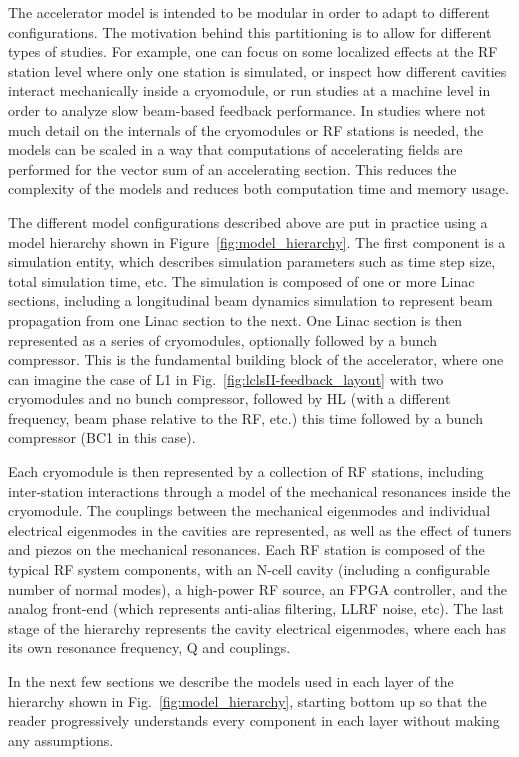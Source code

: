 \documentclass[a4paper,12pt]{article}
\begin{document}
The accelerator model is intended to be modular in order to adapt to different configurations. The motivation behind this partitioning is to allow for different types of studies. For example, one can focus on some localized effects at the RF station level where only one station is simulated, or inspect how different cavities interact mechanically inside a cryomodule, or run studies at a machine level in order to analyze slow beam-based feedback performance. In studies where not much detail on the internals of the cryomodules or RF stations is needed, the models can be scaled in a way that computations of accelerating fields are performed for the vector sum of an accelerating section. This reduces the complexity of the models and reduces both computation time and memory usage.

The different model configurations described above are put in practice using a model hierarchy shown in Figure~\ref{fig:model_hierarchy}. The first component is a simulation entity, which describes simulation parameters such as time step size, total simulation time, etc. The simulation is composed of one or more Linac sections, including a longitudinal beam dynamics simulation to represent beam propagation from one Linac section to the next. One Linac section is then represented as a series of cryomodules, optionally followed by a bunch compressor. This is the fundamental building block of the accelerator, where one can imagine the case of L1 in Fig.~\ref{fig:lclsII-feedback_layout} with two cryomodules and no bunch compressor, followed by HL (with a different frequency, beam phase relative to the RF, etc.) this time followed by a bunch compressor (BC1 in this case).

Each cryomodule is then represented by a collection of RF stations, including inter-station interactions through a model of the mechanical resonances inside the cryomodule. The couplings between the mechanical eigenmodes and individual electrical eigenmodes in the cavities are represented, as well as the effect of tuners and piezos on the mechanical resonances. Each RF station is composed of the typical RF system components, with an N-cell cavity (including a configurable number of normal modes), a high-power RF source, an FPGA controller, and the analog front-end (which represents anti-alias filtering, LLRF noise, etc). The last stage of the hierarchy represents the cavity electrical eigenmodes, where each has its own resonance frequency, Q and couplings.

In the next few sections we describe the models used in each layer of the hierarchy shown in Fig.~\ref{fig:model_hierarchy}, starting bottom up so that the reader progressively understands every component in each layer without making any assumptions.
\end{document}
